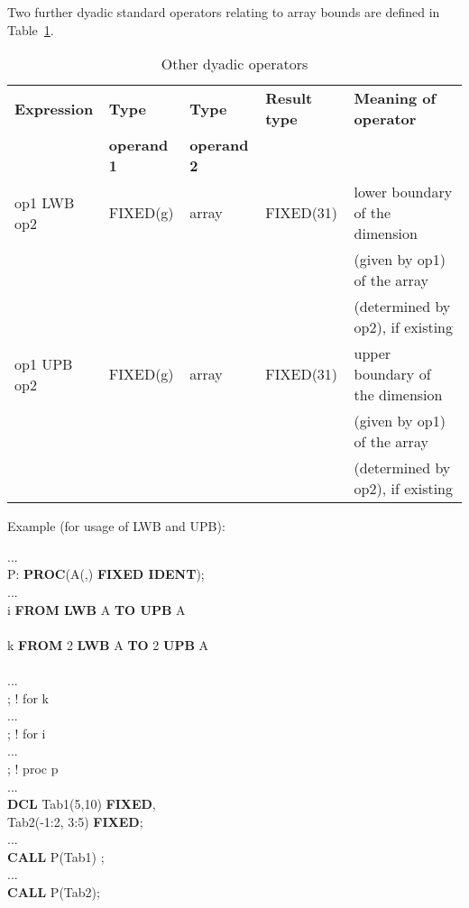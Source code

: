 Two further dyadic standard operators relating to array bounds are defined in Table~\ref{tab_dyadic_other}.

\begin{table} %
\begin{center}
\caption{Other dyadic operators}
\label{tab_dyadic_other}
\vspace{5mm}
\begin{tabular}{|l|l|l|l|l|}
\hline
{\bf Expression} & {\bf Type}      & {\bf Type}      & {\bf Result type} & {\bf Meaning of operator}\\
                 & {\bf operand 1} & {\bf operand 2} &                   & \\ \hline

op1 LWB op2      & FIXED(g)        & array           & FIXED(31)         & lower boundary of the dimension\\
                 &                 &                 &                   & (given by op1) of the array\\
                 &                 &                 &                   & (determined by op2), if existing\\ \hline

op1 UPB op2      & FIXED(g)        & array           & FIXED(31)         & upper boundary of the dimension\\
                 &                 &                 &                   & (given by op1) of the array\\
                 &                 &                 &                   & (determined by op2), if existing\\ 
\hline
\end{tabular}
\end{center}
\end{table}

\newpage
Example (for usage of LWB and UPB):

...\\
P: {\bf PROC}(A(,) {\bf FIXED IDENT});\\
\x ... \\
 i {\bf FROM LWB} A {\bf TO UPB} A\\
\x {} \\
\x \x {} k {\bf FROM} 2 {\bf LWB} A {\bf TO} 2 {\bf UPB} A \\
\x \x \x {} \\
\x \x \x \x \x ...\\
\x \x \x {}; ! for k\\
\x \x ... \\
\x {}; ! for i\\
\x ...\\
; ! proc p \\
...\\
{\bf DCL} Tab1(5,10) {\bf FIXED},\\
\x Tab2(-1:2, 3:5) {\bf FIXED};\\
... \\
{\bf CALL} P(Tab1) ;\\
...\\
{\bf CALL} P(Tab2);


